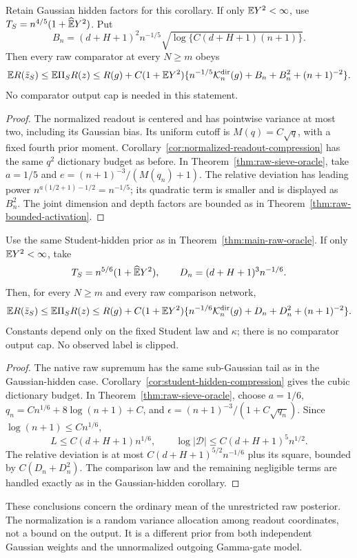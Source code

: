 \begin{corollary}
\label{cor:dirichlet-raw-finitevariance}
Retain Gaussian hidden factors for this corollary. If only $\mathbb E Y^2<\infty$, use
$T_S=n^{4/5}(1+\widehat{\mathbb E}Y^2)$. Put
\[
 B_n=(d+H+1)^2n^{-1/5}
            \sqrt{\log\{C(d+H+1)(n+1)\}}.
\]
Then every raw comparator at every $N\ge m$ obeys
\[
 \mathbb E R(\bar z_S)\le\mathbb E\Pi_S R(z)
 \le R(g)+C(1+\mathbb E Y^2)
       \{n^{-1/5}\mathcal K_n^{\rm dir}(g)+B_n+B_n^2+(n+1)^{-2}\}.
\]
No comparator output cap is needed in this statement.
\end{corollary}
\begin{proof}
The normalized readout is centered and has pointwise variance at most
two, including its Gaussian bias. Its uniform cutoff is
$M(q)=C\sqrt q$, with a fixed fourth prior moment.
Corollary~\ref{cor:normalized-readout-compression} has the same
$q^2$ dictionary budget as before. In
Theorem~\ref{thm:raw-sieve-oracle}, take $a=1/5$ and
$e=(n+1)^{-3}/(M(q_n)+1)$. The relative deviation has leading
power $n^{a(1/2+1)-1/2}=n^{-1/5}$; its quadratic term is smaller
and is displayed as $B_n^2$. The joint dimension and depth factors
are bounded as in Theorem~\ref{thm:raw-bounded-activation}.
\end{proof}


\begin{corollary}
\label{cor:student-dirichlet-finitevariance}
Use the same Student-hidden prior as in
Theorem~\ref{thm:main-raw-oracle}. If only $\mathbb E Y^2<\infty$, take
\[
 T_S=n^{5/6}(1+\widehat{\mathbb E}Y^2),\qquad
 D_n=(d+H+1)^3 n^{-1/6}.
\]
Then, for every $N\ge m$ and every raw comparison network,
\[
 \mathbb E R(\bar z_S)\le\mathbb E\Pi_S R(z)
 \le R(g)+C(1+\mathbb E Y^2)
 \{n^{-1/6}\mathcal K_n^{\rm dir}(g)+D_n+D_n^2+(n+1)^{-2}\}.
\]
Constants depend only on the fixed Student law and $\kappa$; there is
no comparator output cap. No observed label is clipped.
\end{corollary}
\begin{proof}
The native raw supremum has the same sub-Gaussian tail as in the
Gaussian-hidden case. Corollary~\ref{cor:student-hidden-compression}
gives the cubic dictionary budget. In
Theorem~\ref{thm:raw-sieve-oracle}, choose $a=1/6$,
$q_n=Cn^{1/6}+8\log(n+1)+C$, and
$\epsilon=(n+1)^{-3}/(1+C\sqrt{q_n})$.
Since $\log(n+1)\le Cn^{1/6}$,
\[
 L\le C(d+H+1)n^{1/6},\qquad
 \log|\mathcal D|\le C(d+H+1)^5 n^{1/2}.
\]
The relative deviation is at most
$C(d+H+1)^{5/2}n^{-1/6}$ plus its square, bounded by
$C(D_n+D_n^2)$. The comparison law and the remaining negligible
terms are handled exactly as in the Gaussian-hidden corollary.
\end{proof}

These conclusions concern the ordinary mean of the unrestricted raw
posterior. The normalization is a random variance allocation among
readout coordinates, not a bound on the output. It is a different prior
from both independent Gaussian weights and the unnormalized outgoing
Gamma-gate model.
